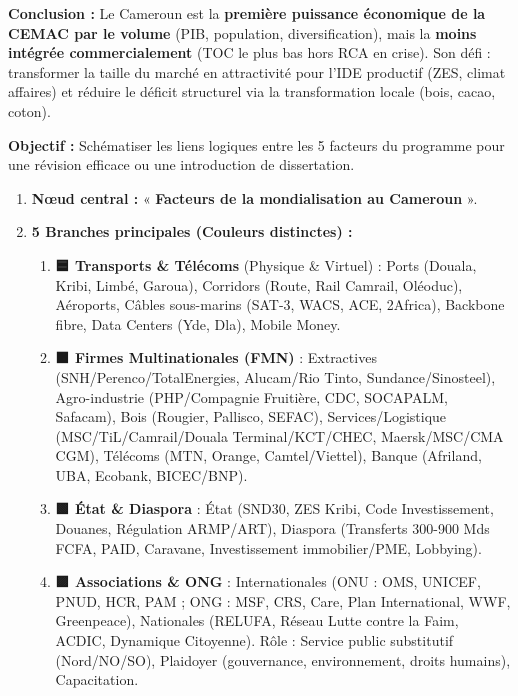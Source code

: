 \documentclass[11pt]{article}
\begin{document}
\begin{exoresolu}
\begin{enumerate}
\begin{itemize}
    \end{itemize}
    \textbf{Conclusion :} Le Cameroun est la \textbf{première puissance économique de la CEMAC par le volume} (PIB, population, diversification), mais la \textbf{moins intégrée commercialement} (TOC le plus bas hors RCA en crise). Son défi : transformer la taille du marché en attractivité pour l'IDE productif (ZES, climat affaires) et réduire le déficit structurel via la transformation locale (bois, cacao, coton).
\end{enumerate}
\end{exoresolu}

\begin{methode}
\textbf{Objectif :} Schématiser les liens logiques entre les 5 facteurs du programme pour une révision efficace ou une introduction de dissertation.
\begin{enumerate}
    \item \textbf{Nœud central :} « \textbf{Facteurs de la mondialisation au Cameroun} ».
    \item \textbf{5 Branches principales (Couleurs distinctes) :}
    \begin{enumerate}
        \item \textbf{🟦 Transports \& Télécoms} (Physique \& Virtuel) : Ports (Douala, Kribi, Limbé, Garoua), Corridors (Route, Rail Camrail, Oléoduc), Aéroports, Câbles sous-marins (SAT-3, WACS, ACE, 2Africa), Backbone fibre, Data Centers (Yde, Dla), Mobile Money.
        \item \textbf{🟧 Firmes Multinationales (FMN)} : Extractives (SNH/Perenco/TotalEnergies, Alucam/Rio Tinto, Sundance/Sinosteel), Agro-industrie (PHP/Compagnie Fruitière, CDC, SOCAPALM, Safacam), Bois (Rougier, Pallisco, SEFAC), Services/Logistique (MSC/TiL/Camrail/Douala Terminal/KCT/CHEC, Maersk/MSC/CMA CGM), Télécoms (MTN, Orange, Camtel/Viettel), Banque (Afriland, UBA, Ecobank, BICEC/BNP).
        \item \textbf{🟩 État \& Diaspora} : État (SND30, ZES Kribi, Code Investissement, Douanes, Régulation ARMP/ART), Diaspora (Transferts 300-900 Mds FCFA, PAID, Caravane, Investissement immobilier/PME, Lobbying).
        \item \textbf{🟪 Associations \& ONG} : Internationales (ONU : OMS, UNICEF, PNUD, HCR, PAM ; ONG : MSF, CRS, Care, Plan International, WWF, Greenpeace), Nationales (RELUFA, Réseau Lutte contre la Faim, ACDIC, Dynamique Citoyenne). Rôle : Service public substitutif (Nord/NO/SO), Plaidoyer (gouvernance, environnement, droits humains), Capacitation.

\end{enumerate}
\end{enumerate}
\end{methode}
\end{document}
